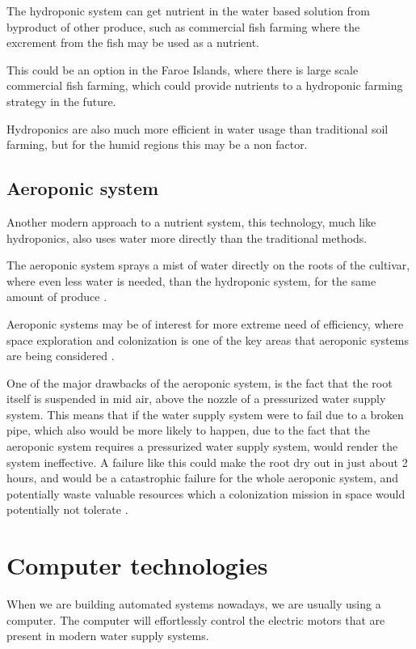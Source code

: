 \documentclass[12pt,a4paper,oneside]{book}
\begin{document}
The hydroponic system can get nutrient in the water based solution from byproduct of other produce, such as commercial fish farming where the excrement from the fish may be used as a nutrient.

This could be an option in the Faroe Islands, where there is large scale commercial fish farming, which could provide nutrients to a hydroponic farming strategy in the future.

Hydroponics are also much more efficient in water usage than traditional soil farming, but for the humid regions this may be a non factor.

\subsection{Aeroponic system}
Another modern approach to a nutrient system, this technology, much like hydroponics, also uses water more directly than the traditional methods.

The aeroponic system sprays a mist of water directly on the roots of the cultivar, where even less water is needed, than the hydroponic system, for the same amount of produce \cite{aeroponic2}.

Aeroponic systems may be of interest for more extreme need of efficiency, where space exploration and colonization is one of the key areas that aeroponic systems are being considered \cite{mars_agriculture}.

One of the major drawbacks of the aeroponic system, is the fact that the root itself is suspended in mid air, above the nozzle of a pressurized water supply system. This means that if the water supply system were to fail due to a broken pipe, which also would be more likely to happen, due to the fact that the aeroponic system requires a pressurized water supply system, would render the system ineffective. A failure like this could make the root dry out in just about 2 hours, and would be a catastrophic failure for the whole aeroponic system, and potentially waste valuable resources which a colonization mission in space would potentially not tolerate \cite{mars_agriculture}.

\section{Computer technologies}
When we are building automated systems nowadays, we are usually using a computer.
The computer will effortlessly control the electric motors that are present in modern water supply systems.
\end{document}
